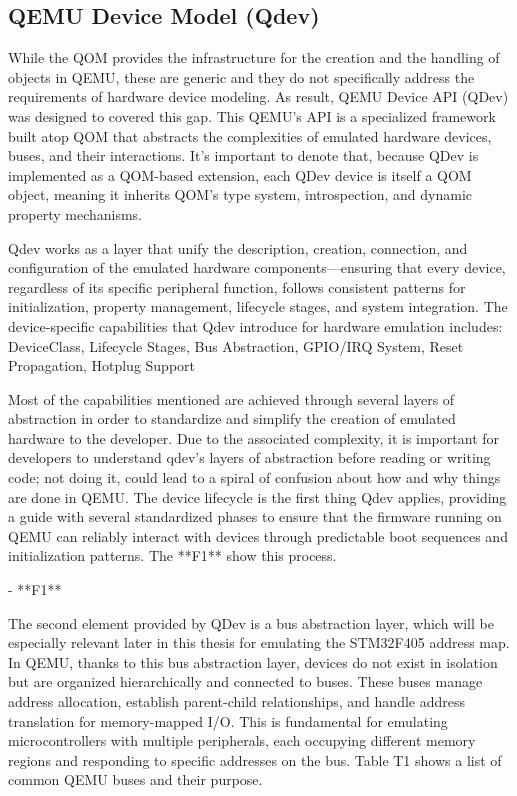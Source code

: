 \subsection{QEMU Device Model (Qdev)}
\label{chap:QEMU_qdev}

While the QOM provides the infrastructure for the creation and the handling 
of objects in QEMU, these are generic and they do not specifically address the 
requirements of hardware device modeling. As result, QEMU Device API (QDev) 
was designed to covered this gap. This QEMU's API is a specialized framework built 
atop QOM that abstracts the complexities of emulated hardware devices, buses, and 
their interactions. It's important to denote that, because QDev is implemented as a 
QOM-based extension, each QDev device is itself a QOM object, meaning it inherits 
QOM's type system, introspection, and dynamic property mechanisms.

Qdev works as a layer that unify the description, creation, connection, and 
configuration of the emulated hardware components—ensuring that every device, 
regardless of its specific peripheral function, follows consistent patterns for initialization, 
property management, lifecycle stages, and system integration. The device-specific 
capabilities that Qdev introduce for hardware emulation includes: DeviceClass, 
Lifecycle Stages, Bus Abstraction, GPIO/IRQ System, Reset Propagation, Hotplug Support


Most of the capabilities mentioned are achieved through several layers of 
abstraction in order to standardize and simplify the creation of emulated hardware to 
the developer. Due to the associated complexity, it is important for developers to 
understand qdev's layers of abstraction before reading or writing code; not doing it, 
could lead to a spiral of confusion about how and why things are done in QEMU. 
The device lifecycle is the first thing Qdev applies, providing a guide with several 
standardized phases to ensure that the firmware running on QEMU can reliably interact 
with devices through predictable boot sequences and initialization patterns. 
The **F1** show this process.

- **F1**

The second element provided by QDev is a bus abstraction layer, which will be 
especially relevant later in this thesis for emulating the STM32F405 address map. 
In QEMU, thanks to this bus abstraction layer, devices do not exist in isolation 
but are organized hierarchically and connected to buses. These buses manage 
address allocation, establish parent-child relationships, and handle address translation 
for memory-mapped I/O. This is fundamental for emulating microcontrollers with 
multiple peripherals, each occupying different memory regions and responding to 
specific addresses on the bus. Table T1 shows a list of common QEMU buses 
and their purpose.

